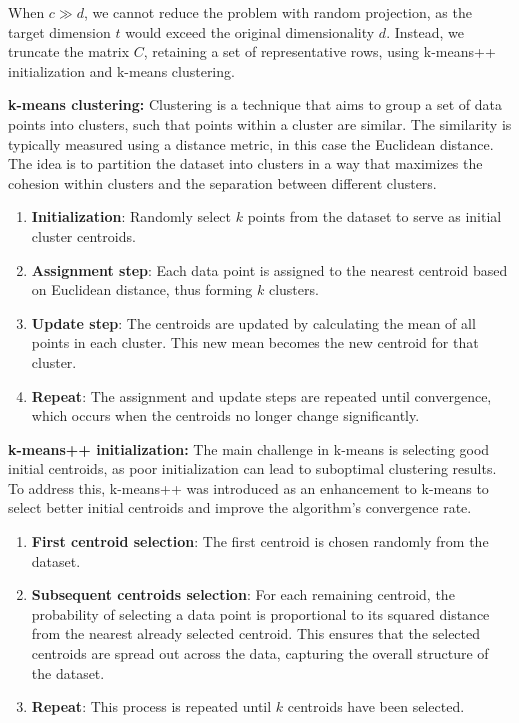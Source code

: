 \documentclass{article}
\begin{document}
When \( c \gg d \), we cannot reduce the problem with random projection, as the target dimension \( t \) would exceed the original dimensionality \( d \). Instead, we truncate the matrix \( C \), retaining a set of representative rows, using k-means++ initialization and k-means clustering.  

\textbf{k-means clustering:} Clustering is a technique that aims to group a set of data points into clusters, such that points within a cluster are similar. The similarity is typically measured using a distance metric, in this case the Euclidean distance. The idea is to partition the dataset into clusters in a way that maximizes the cohesion within clusters and the separation between different clusters.

\begin{enumerate}
    \item \textbf{Initialization}: Randomly select \( k \) points from the dataset to serve as initial cluster centroids.
    \item \textbf{Assignment step}: Each data point is assigned to the nearest centroid based on Euclidean distance, thus forming \( k \) clusters.
    \item \textbf{Update step}: The centroids are updated by calculating the mean of all points in each cluster. This new mean becomes the new centroid for that cluster.
    \item \textbf{Repeat}: The assignment and update steps are repeated until convergence, which occurs when the centroids no longer change significantly.
\end{enumerate}

\textbf{k-means++ initialization:} The main challenge in k-means is selecting good initial centroids, as poor initialization can lead to suboptimal clustering results. To address this, k-means++ was introduced as an enhancement to k-means to select better initial centroids and improve the algorithm’s convergence rate.

\begin{enumerate}
    \item \textbf{First centroid selection}: The first centroid is chosen randomly from the dataset.
    \item \textbf{Subsequent centroids selection}: For each remaining centroid, the probability of selecting a data point is proportional to its squared distance from the nearest already selected centroid. This ensures that the selected centroids are spread out across the data, capturing the overall structure of the dataset.
    \item \textbf{Repeat}: This process is repeated until \( k \) centroids have been selected.
\end{enumerate}
\end{document}
